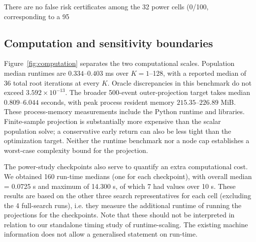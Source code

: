 There are no false risk certificates among the 32 power cells (0/100, corresponding to a 95%

\subsection{Computation and sensitivity boundaries}
Figure~\ref{fig:computation} separates the two computational scales. Population median runtimes are $0.334$--$0.403$ ms over $K=1$--128, with a reported median of 36 total root iterations at every $K$. Oracle discrepancies in this benchmark do not exceed $3.592\times10^{-13}$. The broader 500-event outer-projection target takes median $0.809$--$6.044$ seconds, with peak process resident memory $215.35$--$226.89$ MiB. These process-memory measurements include the Python runtime and libraries. Finite-sample projection is substantially more expensive than the scalar population solve; a conservative early return can also be less tight than the optimization target. Neither the runtime benchmark nor a node cap establishes a worst-case complexity bound for the projection.

The power-study checkpoints also serve to quantify an extra computational cost. We obtained 160 run-time medians (one for each checkpoint), with overall median = 0.0725 s and maximum of 14.300 s, of which 7 had values over 10 s. These results are based on the other three search representatives for each cell (excluding the 4 full-search runs), i.e. they measure the additional runtime of running the projections for the checkpoints. Note that these should not be interpreted in relation to our standalone timing study of runtime-scaling. The existing machine information does not allow a generalised statement on run-time.

